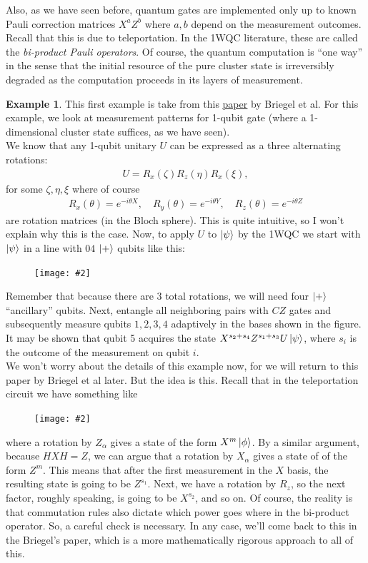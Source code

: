 \documentclass{book}
\theoremstyle{definition}
\newtheorem{exmp}{Example}[section]
\newcommand{\al}{\alpha}
\newcommand{\fig}[2]{
	\begin{figure}[!htb]
		\centering
		\texttt{[image: \#2]}
	\end{figure}}
\begin{document}
Also, as we have seen before, quantum gates are implemented only up to known Pauli correction matrices $X^a Z^b$ where $a,b$ depend on the measurement outcomes. Recall that this is due to teleportation. In the 1WQC literature, these are called the \textit{bi-product Pauli operators}. Of course, the quantum computation is ``one way'' in the sense that the initial resource of the pure cluster state is irreversibly degraded as the computation proceeds in its layers of measurement. 

\begin{exmp}
	This first example is take from this \href{https://arxiv.org/pdf/quant-ph/0301052.pdf}{\underline{paper}} by Briegel et al. For this example, we look at measurement patterns for 1-qubit gate (where a 1-dimensional cluster state suffices, as we have seen). \\
	
	We know that any 1-qubit unitary $U$ can be expressed as a three alternating rotations:
	\begin{align}
	U = R_x (\zeta)R_z(\eta)R_x(\xi),
	\end{align}
	for some $\zeta, \eta, \xi$ where of course 
	\begin{align}
	R_x(\theta) = e^{-i\theta X}, \quad R_y(\theta) = e^{-i\theta Y}, \quad R_z(\theta) = e^{-i\theta Z}
	\end{align}
	are rotation matrices (in the Bloch sphere). This is quite intuitive, so I won't explain why this is the case. Now, to apply $U$ to $\ket{\psi}$ by the 1WQC we start with $\ket{\psi}$ in a line with $04$ $\ket{+}$ qubits like this:
	
	\fig{0.3}{rotate}
	
	Remember that because there are 3 total rotations, we will need four $\ket{+}$ ``ancillary'' qubits. Next, entangle all neighboring pairs with $CZ$ gates and subsequently measure qubits $1,2,3,4$ adaptively in the bases shown in the figure. It may be shown that qubit 5 acquires the state $X^{s_2 + s_4} Z^{s_1 + s_3} U\ket{\psi}$, where $s_i$ is the outcome of the measurement on qubit $i$. \\
	
	We won't worry about the details of this example now, for we will return to this paper by Briegel et al later. But the idea is this. Recall that in the teleportation circuit we have something like
	
	\fig{0.3}{tele}
	
	where a rotation by $Z_\al$ gives a state of the form $X^m \ket{\phi}$. By a similar argument, because $HXH = Z$, we can argue that a rotation by $X_\al$ gives a state of of the form $Z^m$. This means that after the first measurement in the $X$ basis, the resulting state is going to be $Z^{s_1}$. Next, we have a rotation by $R_z$, so the next factor, roughly speaking, is going to be $X^{s_2}$, and so on. Of course, the reality is that commutation rules also dictate which power goes where in the bi-product operator. So, a careful check is necessary. In any case, we'll come back to this in the Briegel's paper, which is a more mathematically rigorous approach to all of this. 
\end{exmp}
\end{document}
